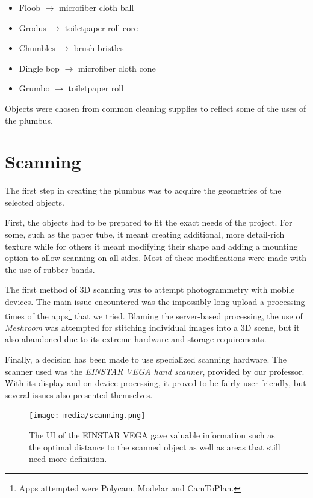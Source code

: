\documentclass[12pt,a4paper]{article}
\begin{document}
\begin{itemize}
  \item Floob $\to$ microfiber cloth ball
  \item Grodus $\to$ toiletpaper roll core
  \item Chumbles $\to$ brush bristles
  \item Dingle bop $\to$ microfiber cloth cone
  \item Grumbo $\to$ toiletpaper roll
\end{itemize}

Objects were chosen from common cleaning supplies to reflect some of the uses of
the plumbus.

\section{Scanning}

The first step in creating the plumbus was to acquire the geometries of the
selected objects.

First, the objects had to be prepared to fit the exact needs of the project. For
some, such as the paper tube, it meant creating additional, more detail-rich
texture while for others it meant modifying their shape and adding a mounting
option to allow scanning on all sides. Most of these modifications were made
with the use of rubber bands.

The first method of 3D scanning was to attempt photogrammetry
with mobile devices. The main issue encountered was the impossibly long upload a
processing times of the apps\footnote{Apps attempted were Polycam, Modelar and
CamToPlan.} that we tried. Blaming the server-based processing, the use of
\emph{Meshroom} was attempted for stitching individual images into a 3D scene,
but it also abandoned due to its extreme hardware and storage requirements.

Finally, a decision has been made to use specialized scanning hardware.
The scanner used was the \emph{EINSTAR VEGA hand scanner},
provided by our professor. With its display and on-device processing, it proved
to be fairly user-friendly, but several issues also presented themselves.

\begin{figure}[h]
  \centering
  \texttt{[image: media/scanning.png]}
  \caption{The UI of the EINSTAR VEGA gave valuable information such as the
    optimal distance to the scanned object as well as areas that still need more
  definition.}
\end{figure}
\end{document}
